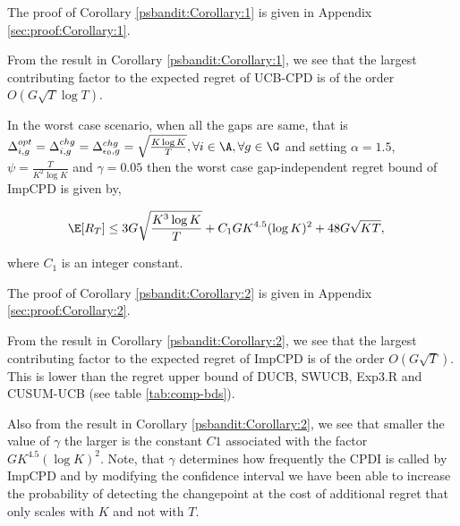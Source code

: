 \begin{customproof}{5}
The proof of Corollary \ref{psbandit:Corollary:1} is given in Appendix \ref{sec:proof:Corollary:1}.
\end{customproof}

\begin{discussion}
\label{dis:Corollary:1}
From the result in Corollary \ref{psbandit:Corollary:1}, we see that the largest contributing factor to the expected regret of  UCB-CPD is of the order $O\left( G\sqrt{T}\log T\right)$.
\end{discussion}



\begin{customcorollary}{2}
\label{psbandit:Corollary:2}
In the worst case scenario, when all the gaps are same, that is $\Delta^{opt}_{i,g}=\Delta^{chg}_{i,g}=\Delta^{chg}_{\epsilon_0,g}=\sqrt{\frac{K\log K}{T}}, \forall i\in\A,\forall g\in\G$ and setting $\alpha=1.5$, $\psi = \frac{T}{K^2\log K}$ and $\gamma = 0.05$ then the worst case gap-independent regret bound of ImpCPD is given by,

\begin{align*}
\E[R_T]&\leq 3G\sqrt{\dfrac{K^3\log K}{T}} + C_1 GK^{4.5}(\log K)^{2} + 48G\sqrt{KT},
\end{align*}

where $C_1$ is an integer constant.

\end{customcorollary}

\begin{customproof}{6}
The proof of Corollary \ref{psbandit:Corollary:2} is given in Appendix \ref{sec:proof:Corollary:2}.
\end{customproof}

\begin{discussion}
\label{dis:Corollary:2}
From the result in Corollary \ref{psbandit:Corollary:2}, we see that the largest contributing factor to the expected regret of ImpCPD is of the order $O\left( G\sqrt{T}\right)$. This is lower than the regret upper bound of DUCB, SWUCB, Exp3.R and  CUSUM-UCB (see table \ref{tab:comp-bds}).
\end{discussion}

\begin{discussion}
\label{dis:Corollary:21}
Also from the result in Corollary \ref{psbandit:Corollary:2}, we see that smaller the value of $\gamma$ the larger is the constant $C1$ associated with the factor $GK^{4.5}(\log K)^{2}$. Note, that $\gamma$ determines how frequently the CPDI is called by ImpCPD and by modifying the confidence interval we have been able to increase the probability of detecting the changepoint at the cost of additional regret that only scales with $K$ and not with $T$.
\end{discussion}


